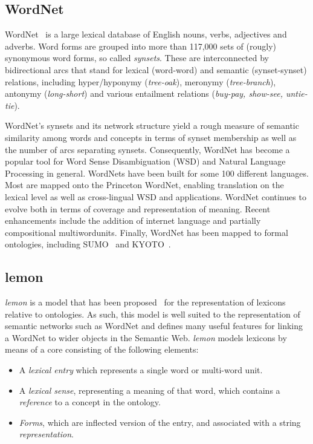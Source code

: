 \documentclass[10pt, a4paper]{article}
\newcommand{\lemon}[0]{\emph{lemon}}
\begin{document}
\subsection{WordNet}

WordNet~\cite{miller1995wordnet,fellbaum1998wordnet,fellbaum2010wordnet} is a large lexical database of English nouns,
verbs, adjectives and adverbs. Word forms are grouped into more than 117,000 sets of
(rougly) synonymous word forms, so called \emph{synsets}. These are interconnected by bidirectional
arcs that stand for lexical (word-word) and semantic (synset-synset) relations, including
hyper/hyponymy (\emph{tree-oak}), meronymy (\emph{tree-branch}), antonymy
(\emph{long-short}) and various entailment relations (\emph{buy-pay, show-see, untie-
tie}).

WordNet's synsets and its network structure yield a rough measure of semantic similarity
among words and concepts in terms of synset membership as well as the number of arcs
separating synsets. Consequently, WordNet has become a popular tool for Word Sense
Disambiguation (WSD) and Natural Language Processing in general. WordNets have
been built for some 100 different languages. Most are mapped onto the Princeton
WordNet, enabling translation on the lexical level as well as cross-lingual WSD and
applications. WordNet continues to evolve both in terms of coverage and representation
of meaning. Recent enhancements include the addition of internet language and partially
compositional multi­word­units. Finally, WordNet has been mapped to formal ontologies, 
including SUMO~\cite{niles2003mapping} and KYOTO~\cite{vossen2011kyoto}.

\subsection{lemon}

\lemon{} is a model that has been proposed~\cite{mccrae2012interchanging} for the representation of
lexicons relative to ontologies. As such, this model is well suited to the
representation of semantic networks such as WordNet and defines many useful
features for linking a WordNet to wider objects in the Semantic Web. \lemon{}
models lexicons by means of a core consisting of the following elements:

\begin{itemize}
  \item A \emph{lexical entry} which represents a single word or multi-word
    unit.
  \item A \emph{lexical sense}, representing a meaning of that word, which
    contains a \emph{reference} to a concept in the ontology.
  \item \emph{Forms}, which are inflected version of the entry, and associated
    with a string \emph{representation}.
\end{itemize}
\end{document}
